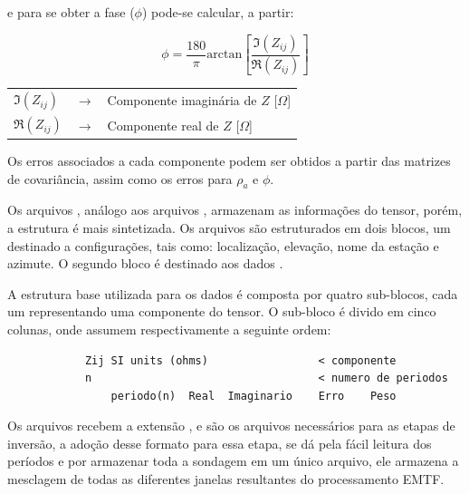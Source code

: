         \noindent e para se obter a fase ($\phi$) pode-se calcular, a partir:
        
        \begin{equation}
         \phi = \dfrac{180}{\pi} \textrm{arctan}\left [\dfrac{\Im(Z_{ij})}{\Re(Z_{ij})} \right ]
        \end{equation}

        {\footnotesize \noindent
            \begin{table}[H]
                \begin{tabular*}{5cm}{p{.9cm}p{0.1cm}p{10cm}}
                    {\footnotesize $\Im(Z_{ij})$}  & {\footnotesize $\rightarrow$} & {\footnotesize Componente imaginária de $Z$ [$\Omega$]}\\
                    {\footnotesize $\Re(Z_{ij})$}  & {\footnotesize $\rightarrow$} & {\footnotesize Componente real de  $Z$ [$\Omega$]}\\
                \end{tabular*}
            \end{table}}
        
        Os erros associados a cada componente podem ser obtidos a partir das matrizes de covariância, assim como os erros para $\rho_a$ e $\phi$.
        
        Os arquivos , análogo aos arquivos , armazenam as informações do tensor, porém, a estrutura é mais sintetizada. Os arquivos são estruturados em dois blocos, um destinado a configurações, tais como: localização, elevação, nome da estação e azimute. O segundo bloco é destinado aos dados \cite{j-format}.
        
        A estrutura base utilizada para os dados é composta por quatro sub-blocos, cada um representando uma componente do tensor. O sub-bloco é divido em cinco colunas, onde assumem respectivamente a seguinte ordem: 
        
\begin{footnotesize}        
\begin{verbatim}
            Zij SI units (ohms)                 < componente
            n                                   < numero de periodos
                periodo(n)  Real  Imaginario    Erro    Peso
\end{verbatim}
\end{footnotesize}
               
        Os arquivos  recebem a extensão , e são os arquivos necessários para as etapas de inversão, a adoção desse formato para essa etapa, se dá pela fácil leitura dos períodos e por armazenar toda a sondagem em um único arquivo, ele armazena a mesclagem de todas as diferentes janelas resultantes do processamento EMTF.
        
